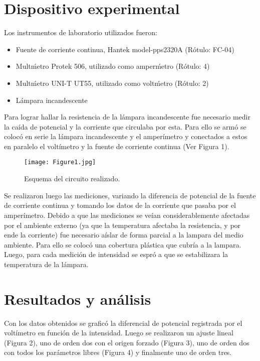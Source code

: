 \documentclass[twoside,twocolumn,a4paper]{article}
\begin{document}

\section{Dispositivo experimental}

Los instrumentos de laboratorio utilizados fueron:
\begin{itemize}
\item 
\label{Fuente} Fuente de corriente continua, Hantek model-pps2320A (R\'otulo: FC-04)
\cite{Fuente}
\item 
\label{amp} Mult\'metro Protek 506, utilizado como amper\'metro (R\'otulo: 4)
\cite{amp}
\item 
\label{volt} Mult\'metro UNI-T UT55, utilizado como volt\'metro (R\'otulo: 2)
\cite{volt}
\item L\'ampara incandescente
\end{itemize}

Para lograr hallar la resistencia de la l\'ampara incandescente fue necesario medir la ca\'ida de potencial y la corriente que circulaba por esta. Para ello se arm\'o se coloc\'o en serie la l\'ampara incandescente y el amper\'imetro y conectados a estos en paralelo el volt\'imetro y la fuente de corriente continua (Ver Figura 1).\par

\begin{figure}
\texttt{[image: Figure1.jpg]}
\caption{Esquema del circuito realizado.}
\end{figure}

Se realizaron luego las mediciones, variando la diferencia de potencial de la fuente de corriente continua
y tomando los datos de la corriente que pasaba por el amper\'imetro. Debido a que las mediciones se ve\'ian considerablemente afectadas por el ambiente externo (ya que la temperatura afectaba la resistencia, y por ende la corriente) fue necesario a\'islar de forma parcial a la lampara del medio ambiente. Para ello se coloc\'o una cobertura pl\'astica que cubr\'ia a la lampara. Luego, para cada medici\'on de intensidad se espr\'o a que se estabilizara la temperatura de la l\'ampara.

\section{Resultados y an\'alisis}

Con los datos obtenidos se grafic\'o la diferencial de potencial registrada por el volt\'imetro en funci\'on de la intensidad. Luego se realizaron un ajuste lineal (Figura 2), uno de orden dos con el origen forzado (Figura 3), uno de orden dos con todos los par\'ametros libres (Figura 4) y finalmente uno de orden tres. 
\end{document}
